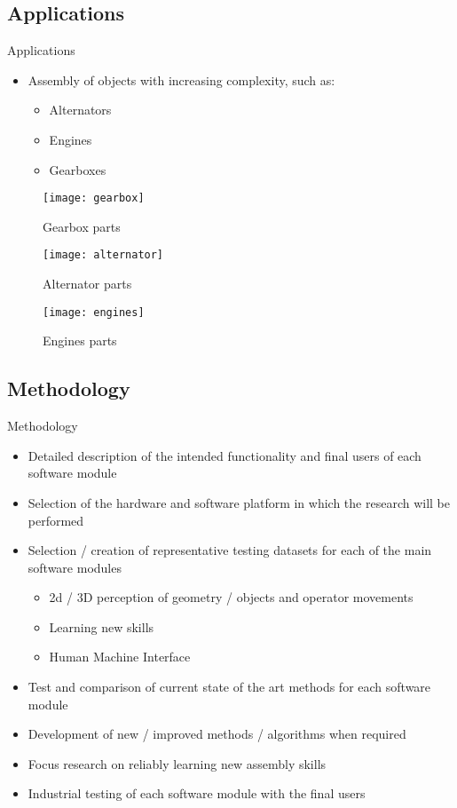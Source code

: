 \subsection{Applications}
\begin{frame}{Applications}
	\begin{itemize}
		\item Assembly of objects with increasing complexity, such as:
		\begin{itemize}
			\item Alternators
			\item Engines
			\item Gearboxes
		\end{itemize}
	\end{itemize}
	\begin{figure}[!ht]
		\centering
		\begin{minipage}{0.32\textwidth}
			\centering
			\texttt{[image: gearbox]}
			\caption{Gearbox parts}
		\end{minipage}%
		\begin{minipage}{.32\textwidth}
			\centering
			\texttt{[image: alternator]}
			\caption{Alternator parts}
		\end{minipage}%
		\begin{minipage}{0.32\textwidth}
			\centering
			\texttt{[image: engines]}
			\caption{Engines parts}
		\end{minipage}
	\end{figure}
\end{frame}

\subsection{Methodology}
\begin{frame}{Methodology}
	\begin{itemize}
		\item Detailed description of the intended functionality and final users of each software module
		\item Selection of the hardware and software platform in which the research will be performed
		\item Selection / creation of representative testing datasets for each of the main software modules
		\begin{itemize}
			\item 2d / 3D perception of geometry / objects and operator movements
			\item Learning new skills
			\item Human Machine Interface
		\end{itemize}
		\item Test and comparison of current state of the art methods for each software module
		\item Development of new / improved methods / algorithms when required
		\item Focus research on reliably learning new assembly skills
		\item Industrial testing of each software module with the final users
	\end{itemize}
\end{frame}
